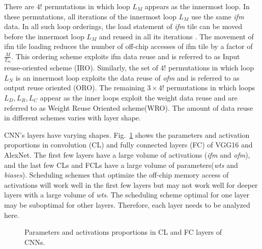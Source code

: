 There are $4!$ permutations in which loop $L_M$ appears as the innermost loop. In these permutations, all iterations of the innermost loop $L_M$ use the same \textit{ifm} data. In all such loop orderings, the load statement of \textit{ifm} tile can be moved before the innermost loop $L_M$ and reused in all its iterations \cite{zhang2015optimizing}. The movement of ifm tile loading reduces the number of off-chip accesses of ifm tile by a factor of $\frac{M}{T_m}$. This ordering scheme exploits ifm data reuse and is referred to as Input reuse-oriented scheme (IRO). Similarly, the set of $4!$ permutations in which loop $L_N$ is an innermost loop exploits the data reuse of \textit{ofm} and is referred to as output reuse oriented (ORO). The remaining $3\times 4!$ permutations in which loops $L_D,L_R,L_C$ appear as the inner loops exploit the weight data reuse and are referred to as Weight Reuse Oriented scheme(WRO). The amount of data reuse in different schemes varies with layer shape.

CNN's layers have varying shapes. Fig.~\ref{fig:ParamsNactProp} shows the parameters and activation proportions in convolution (CL) and fully connected layers (FC) of VGG16 and AlexNet. The first few layers have a large volume of activations (\textit{ifm} and \textit{ofm}), and the last few CLs and FCLs have a large volume of parameters(\textit{wts} and \textit{biases}). Scheduling schemes that optimize the off-chip memory access of activations will work well in the first few layers but may not work well for deeper layers with a large volume of \textit{wts}. The scheduling scheme optimal for one layer may be suboptimal for other layers. Therefore, each layer needs to be analyzed here.
\begin{figure}[!htb]
	\centering
	\captionsetup{font=sf}	
	\hfil	
	\hfil	
	\caption{Parameters and activations proportions in CL and FC layers of CNNs.}
	\label{fig:ParamsNactProp}
\end{figure}
